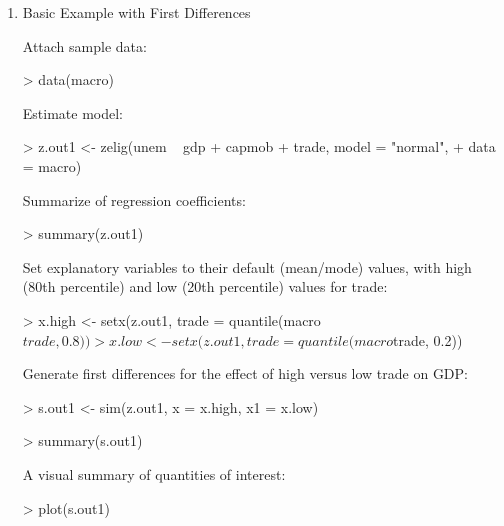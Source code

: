 \documentclass{article}
\begin{document}
\begin{enumerate}
\item Basic Example with First Differences

Attach sample data: 
\begin{Schunk}
\begin{Sinput}
> data(macro)
\end{Sinput}
\end{Schunk}
Estimate model:  
\begin{Schunk}
\begin{Sinput}
> z.out1 <- zelig(unem ~ gdp + capmob + trade, model = "normal", 
+     data = macro)
\end{Sinput}
\end{Schunk}
Summarize of regression coefficients:  
\begin{Schunk}
\begin{Sinput}
> summary(z.out1)
\end{Sinput}
\end{Schunk}
Set explanatory variables to their default (mean/mode) values, with
high (80th percentile) and low (20th percentile) values for trade: 
\begin{Schunk}
\begin{Sinput}
> x.high <- setx(z.out1, trade = quantile(macro$trade, 0.8))
> x.low <- setx(z.out1, trade = quantile(macro$trade, 0.2))
\end{Sinput}
\end{Schunk}
Generate first differences for the effect of high versus low trade on
GDP: 
\begin{Schunk}
\begin{Sinput}
> s.out1 <- sim(z.out1, x = x.high, x1 = x.low)
\end{Sinput}
\end{Schunk}
\begin{Schunk}
\begin{Sinput}
> summary(s.out1)
\end{Sinput}
\end{Schunk}
A visual summary of quantities of interest:  
\begin{center}
\begin{Schunk}
\begin{Sinput}
> plot(s.out1)
\end{Sinput}
\end{Schunk}

\end{center}
\end{enumerate}
\end{document}
